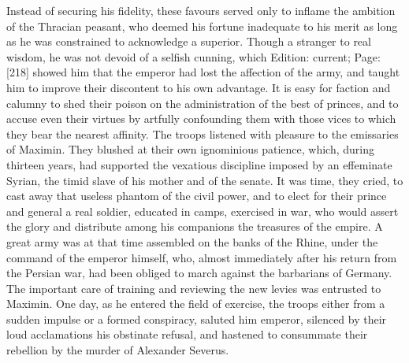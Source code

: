 Instead of securing his fidelity, these favours served only to inflame the ambition of the Thracian peasant, who deemed his fortune inadequate to his merit as long as he was constrained to acknowledge a superior. Though a stranger to real wisdom, he was not devoid of a selfish cunning, which Edition: current; Page: [218] showed him that the emperor had lost the affection of the army, and taught him to improve their discontent to his own advantage. It is easy for faction and calumny to shed their poison on the administration of the best of princes, and to accuse even their virtues by artfully confounding them with those vices to which they bear the nearest affinity. The troops listened with pleasure to the emissaries of Maximin. They blushed at their own ignominious patience, which, during thirteen years, had supported the vexatious discipline imposed by an effeminate Syrian, the timid slave of his mother and of the senate. It was time, they cried, to cast away that useless phantom of the civil power, and to elect for their prince and general a real soldier, educated in camps, exercised in war, who would assert the glory and distribute among his companions the treasures of the empire. A great army was at that time assembled on the banks of the Rhine, under the command of the emperor himself, who, almost immediately after his return from the Persian war, had been obliged to march against the barbarians of Germany. The important care of training and reviewing the new levies was entrusted to Maximin. One day, as he entered the field of exercise, the troops either from a sudden impulse or a formed conspiracy, saluted him emperor, silenced by their loud acclamations his obstinate refusal, and hastened to consummate their rebellion by the murder of Alexander Severus.

